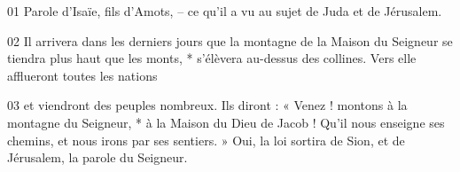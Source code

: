 01 Parole d’Isaïe, fils d’Amots, – ce qu’il a vu au sujet de Juda et de Jérusalem.

02 Il arrivera dans les derniers jours que la montagne de la Maison du Seigneur se tiendra plus haut que les monts, * s’élèvera au-dessus des collines. Vers elle afflueront toutes les nations

03 et viendront des peuples nombreux. Ils diront : « Venez ! montons à la montagne du Seigneur, * à la Maison du Dieu de Jacob ! Qu’il nous enseigne ses chemins, et nous irons par ses sentiers. » Oui, la loi sortira de Sion, et de Jérusalem, la parole du Seigneur.
